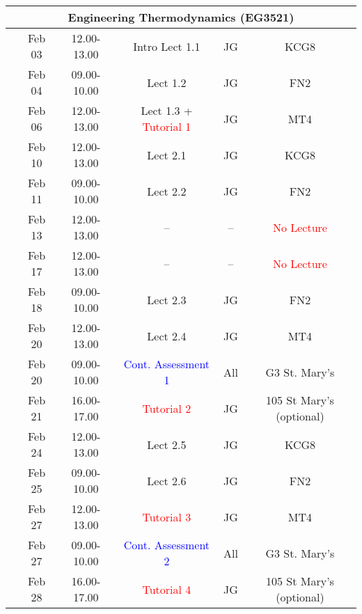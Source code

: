 \documentclass[11pt,oneside,a4paper]{article}
\begin{document}
\begin{center}
\begin{tabular}{||c||c|c|c|c|c||}
\hline\hline
\multicolumn{6}{||c||}{Engineering Thermodynamics (EG3521)} \\
\hline\hline
\multirow{3}{*}{\color{red}{Week 30}} & Feb 03   & 12.00-13.00 & Intro Lect 1.1 & JG  & KCG8 \\
                                      & Feb 04   & 09.00-10.00 & Lect 1.2  & JG  & FN2  \\
                                      & Feb 06   & 12.00-13.00 & Lect 1.3 + \textcolor{red}{Tutorial 1} & JG  & MT4  \\
\hline
\multirow{3}{*}{\color{red}{Week 31}} & Feb 10   & 12.00-13.00 & Lect  2.1  & JG  & KCG8 \\
                                      & Feb 11   & 09.00-10.00 & Lect  2.2  & JG  & FN2 \\
                                      & Feb 13   & 12.00-13.00 &  --        & --    & \textcolor{red}{No Lecture} \\
\hline
\multirow{3}{*}{\color{red}{Week 32}} & Feb 17   & 12.00-13.00 & --         & --     & \textcolor{red}{No Lecture} \\
                                      & Feb 18   & 09.00-10.00 & Lect  2.3  & JG  & FN2  \\
                                      & Feb 20   & 12.00-13.00 & Lect  2.4  & JG  & MT4  \\
                                      & Feb 20   & 09.00-10.00 & \textcolor{blue}{Cont. Assessment 1} & All & G3 St. Mary's \\
                                      & Feb 21   & 16.00-17.00 & \textcolor{red}{Tutorial 2} & JG  & 105 St Mary's (optional)\\
\hline
\multirow{3}{*}{\color{red}{Week 33}} & Feb 24   & 12.00-13.00 & Lect  2.5  & JG  & KCG8 \\
                                      & Feb 25   & 09.00-10.00 & Lect  2.6  & JG  & FN2  \\
                                      & Feb 27   & 12.00-13.00 & \textcolor{red}{Tutorial 3} & JG  & MT4  \\
                                      & Feb 27   & 09.00-10.00 & \textcolor{blue}{Cont. Assessment 2} & All  &  G3 St. Mary's \\
                                      & Feb 28   & 16.00-17.00 & \textcolor{red}{Tutorial 4} & JG  & 105 St Mary's (optional)\\

\end{tabular}
\end{center}
\end{document}
